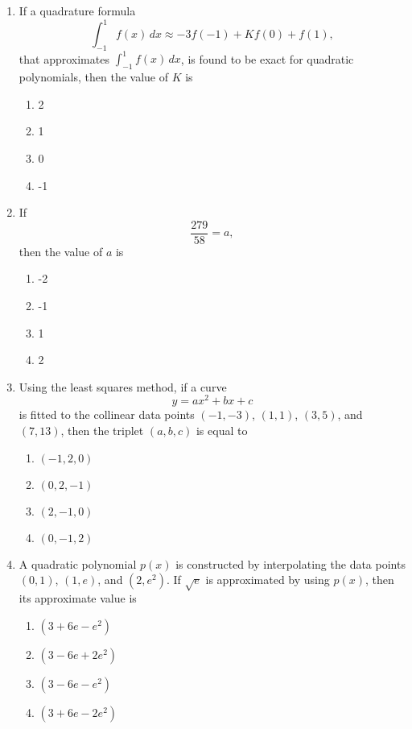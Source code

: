 \documentclass[journal]{IEEEtran}
\numberwithin{equation}{enumi}
\numberwithin{figure}{enumi}
\begin{document}
\begin{enumerate}
\item
If a quadrature formula 
\[
\int_{-1}^1 f(x) \, dx \approx -3 f(-1) + K f(0) + f(1),
\]
that approximates $\int_{-1}^1 f(x) \, dx$, is found to be exact for quadratic polynomials, then the value of $K$ is
\hfill{}
\begin{multicols}{4}
\begin{enumerate}
    \item 2
    \item 1
    \item 0
    \item -1
\end{enumerate}
\end{multicols}

\item
If
\[
\frac{279}{58} = a,
\]
then the value of $a$ is
\hfill{}
\begin{multicols}{4}
\begin{enumerate}
    \item -2
    \item -1
    \item 1
    \item 2
\end{enumerate}
\end{multicols}

\item
Using the least squares method, if a curve 
\[
y = a x^2 + b x + c
\]
is fitted to the collinear data points $(-1,-3)$, $(1,1)$, $(3,5)$, and $(7,13)$, then the triplet $(a,b,c)$ is equal to
\hfill{}
\begin{multicols}{4}
\begin{enumerate}
    \item $(-1, 2, 0)$
    \item $(0, 2, -1)$
    \item $(2, -1, 0)$
    \item $(0, -1, 2)$
\end{enumerate}
\end{multicols}

\item
A quadratic polynomial $p(x)$ is constructed by interpolating the data points $(0,1)$, $(1,e)$, and $(2,e^2)$. If $\sqrt{e}$ is approximated by using $p(x)$, then its approximate value is
\hfill{}
\begin{multicols}{2}
\begin{enumerate}
    \item $(3 + 6 e - e^2)$
    \item $(3 - 6 e + 2 e^2)$
    \item $(3 - 6 e - e^2)$
    \item $(3 + 6 e - 2 e^2)$
\end{enumerate}
\end{multicols}


\end{enumerate}
\end{document}
